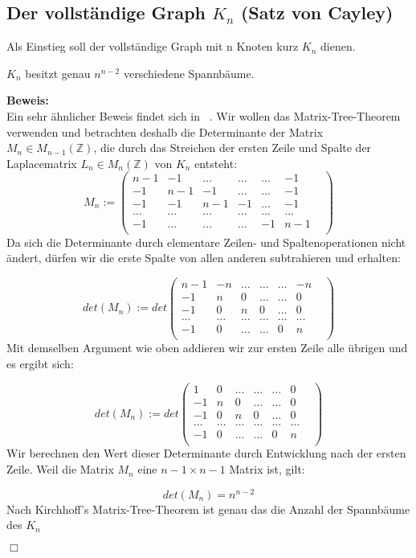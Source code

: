 \subsection{Der vollständige Graph $K_n$ (Satz von Cayley)}

Als Einstieg soll der vollständige Graph mit n Knoten kurz $K_n$ dienen.\\%
\begin{Tms}
$K_n$ besitzt genau $n^{n-2}$ verschiedene Spannbäume.\\
\end{Tms}
\textbf{Beweis:}\\
Ein sehr ähnlicher Beweis findet sich in ~\cite{Lau_2004}.
Wir wollen das Matrix-Tree-Theorem verwenden und betrachten deshalb die Determinante der Matrix $M_n\in M_{n-1}(\mathbb{Z})$, die durch das Streichen der ersten Zeile und Spalte der Laplacematrix $L_n\in M_n(\mathbb{Z})$ von $K_n$ entsteht:
\begin{equation}
M_n:=
\begin{pmatrix}
n-1&-1&\ldots&\ldots&\ldots&-1\\
-1&n-1&-1&\ldots&\ldots&-1\\
-1&-1&n-1&-1&\ldots&-1\\
\ldots&\ldots&\ldots&\ldots&\ldots&\ldots&\\
-1&\ldots&\ldots&\ldots&-1&n-1\\
\end{pmatrix}
\end{equation}
Da sich die Determinante durch elementare Zeilen- und Spaltenoperationen nicht ändert, dürfen wir die erste Spalte von allen anderen subtrahieren und erhalten:

\begin{equation}
det(M_n):=det
\begin{pmatrix}
n-1&-n&\ldots&\ldots&\ldots&-n\\
-1&n&0&\ldots&\ldots&0\\
-1&0&n&0&\ldots&0\\
\ldots&\ldots&\ldots&\ldots&\ldots&\ldots&\\
-1&0&\ldots&\ldots&0&n\\
\end{pmatrix}
\end{equation}
Mit demselben Argument wie oben addieren wir zur ersten Zeile alle übrigen und es ergibt sich:

\begin{equation}
det(M_n):=det
\begin{pmatrix}
1&0&\ldots&\ldots&\ldots&0\\
-1&n&0&\ldots&\ldots&0\\
-1&0&n&0&\ldots&0\\
\ldots&\ldots&\ldots&\ldots&\ldots&\ldots&\\
-1&0&\ldots&\ldots&0&n\\
\end{pmatrix}
\end{equation}
Wir berechnen den Wert dieser Determinante durch Entwicklung nach der ersten Zeile. Weil die Matrix $M_n$ eine $n-1 \times n-1$ Matrix ist, gilt:

\begin{equation}
 det(M_n)=n^{n-2}
\end{equation}
Nach Kirchhoff's Matrix-Tree-Theorem ist genau das die Anzahl der Spannbäume des $K_n$
\begin{flushright} $\Box$ \end{flushright} 
